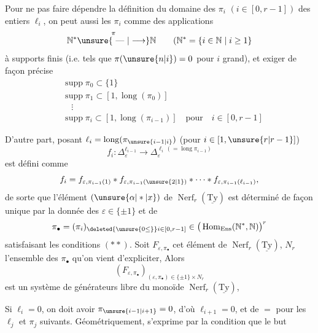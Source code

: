 

Pour ne pas faire dépendre la définition du domaine des $\pi_i$ $(i\in[0,r-1])$ des entiers $\ell_i$, on peut aussi  les $\pi_i$ comme des applications
\[
\mathbb N^*\overset{\pi}{\unsure{\text{ --- }|\longrightarrow}}\mathbb N
\qquad(\mathbb N^*=\{i\in\mathbb N\mid i\geq1\}
\]
à supports finis (i.e. tels que $\pi(\unsure{n|i})=0$ pour $i$ grand), et exiger de façon précise
\[
\begin{aligned}
&\operatorname{supp}\pi_0\subset\{1\}\\
&\operatorname{supp}\pi_1\subset[1,\operatorname{long}(\pi_0)]\\
&\quad\vdots\\
&\boxed{\operatorname{supp}\pi_i\subset[1,\operatorname{long}(\pi_{i-1})]}
\quad\text{pour}\quad\boxed{i\in[0,r-1]}
\end{aligned}
\tag*{($**$)}
\]

D'autre part,  posant $\ell_i=\operatorname{long}(\pi_{\unsure{i-1|i}})$ (pour $i\in[1,\unsure{r|r-1}]$)
\[
 f_i:\Delta_\varepsilon^{\ell_{i-1}}\longrightarrow\Delta_\varepsilon^{\ell_i\,(=\operatorname{long}\pi_{i-1})}
\]
est défini comme
\[
 f_i=f_{\varepsilon,\pi_{i-1}(1)}*f_{\varepsilon,\pi_{i-1}(\unsure{2|1})}*
 \cdots*f_{\varepsilon,\pi_{i-1}(\ell_{i-1})},
\]
de sorte que l'élément $(\unsure{\alpha|*|x})$ de $\operatorname{Nerf}_r(\underline{\mathrm{Ty}})$ est déterminé de façon unique par la donnée des \deleted{$\unsure{\pi}$} $\varepsilon\in\{\pm1\}$ et de
\[
\pi_{\bullet}=(\pi_i)_{\deleted{\unsure{0\leq}}i\in[0,r-1]}
 \in\big(\operatorname{Hom}_{\mathrm{Ens}}(\mathbb N^*,\mathbb N)\big)^r
\]
satisfaisant les conditions $(**)$.  Soit $F_{\varepsilon,\pi_\bullet}$  cet élément de $\operatorname{Nerf}_r(\underline{\mathrm{Ty}})$,   $N_r$ l'ensemble des $\pi_\bullet$ qu'on vient d'expliciter, Alors
\[
(F_{\varepsilon,\pi_\bullet})_{(\varepsilon,\pi_\bullet)\in\{\pm1\}\times N_r}
\]
est un système de générateurs libre du monoïde $\operatorname{Nerf}_r(\underline{\mathrm{Ty}})$,

Si $\ell_i=0$, on doit avoir  $\pi_{\unsure{i-1|i+1}}=0$, d'où $\ell_{i+1}=0$, et de $=$ pour les $\ell_j$ et $\pi_j$ suivants. Géométriquement,  s'exprime par la condition que le but
